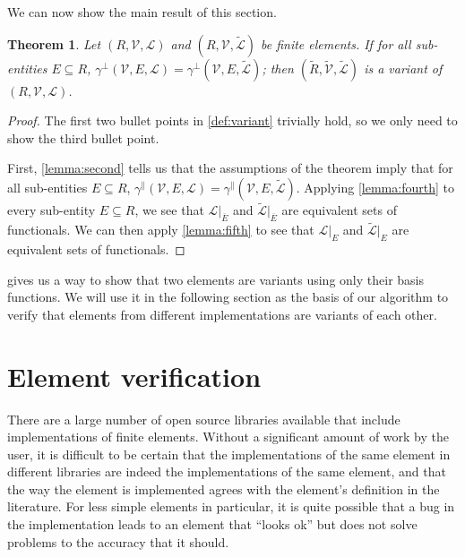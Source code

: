 \documentclass[sn-mathphys-num]{sn-jnl}%
\theoremstyle{thmstyleone}%
\newtheorem{theorem}{Theorem}%
\newcommand{\closure}[1]{\overline{#1}}
\newcommand{\subentity}{E}
\newcommand{\refel}{R}
\newcommand{\polyspace}{\mathcal{V}}
\newcommand{\dualbasis}{\mathcal{L}}
\newcommand{\unctrace}[3]{\gamma^\perp(#1,#2,#3)}
\newcommand{\ctrace}[3]{\gamma^\parallel(#1,#2,#3)}
\theoremstyle{thmstyletwo}%
\theoremstyle{thmstylethree}%
\begin{document}
We can now show the main result of this section.

\begin{theorem}\label{lemma:verification}
Let $(\refel,\polyspace,\dualbasis)$ and $(\refel,\polyspace,\tilde{\dualbasis})$ be finite elements.
If
for all sub-entities $\subentity\subseteq\refel$,
$\unctrace{\polyspace}{\subentity}{\dualbasis} = \unctrace{\polyspace}{\subentity}{\tilde{\dualbasis}}$;
then $(\tilde{\refel},\tilde{\polyspace},\tilde{\dualbasis})$ is a variant of $(\refel,\polyspace,\dualbasis)$.
\end{theorem}
\begin{proof}
The first two bullet points in \cref{def:variant} trivially hold, so we only need to show the
third bullet point.

First, \cref{lemma:second} tells us that the assumptions of the theorem imply that
for all sub-entities $\subentity\subseteq\refel$,
$\ctrace{\polyspace}{\subentity}{\dualbasis} = \ctrace{\polyspace}{\subentity}{\tilde{\dualbasis}}$.
Applying \cref{lemma:fourth} to every sub-entity $\subentity\subseteq\refel$, we see that
$\left.\dualbasis\right|_{\closure{\subentity}}$ and $\tilde{\dualbasis}|_{\closure{\subentity}}$
are equivalent sets of functionals. We can then apply \cref{lemma:fifth} to see that
$\left.\dualbasis\right|_{\subentity}$ and $\tilde{\dualbasis}|_{\subentity}$
are equivalent sets of functionals.
\end{proof}

 gives us a way to show that two elements are variants using only their basis functions.
We will use it in the following section as the basis of our algorithm to verify that elements from
different implementations are variants of each other.


\section{Element verification}\label{sec:verification}
There are a large number of open source libraries available that include implementations of
finite elements. Without a significant amount of work by the user, it is difficult to be
certain that the implementations of the same element in different libraries are indeed
the implementations of the same element, and that the way the element is implemented
agrees with the element's definition in the literature. For less simple elements in particular,
it is quite possible that a bug in the implementation leads to an element that ``looks ok''
but does not solve problems to the accuracy that it should.
\end{document}
